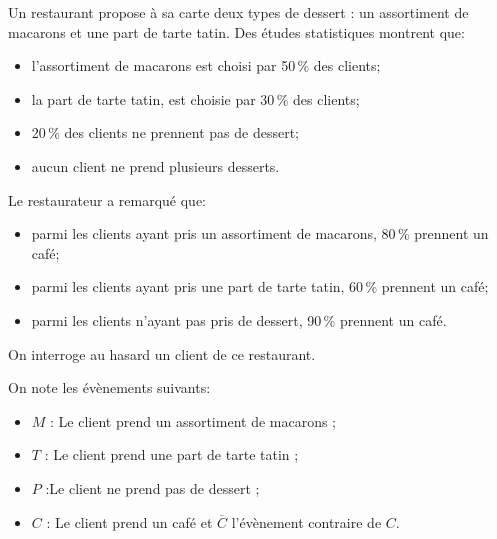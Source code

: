 \medskip

Un restaurant propose à sa carte deux types de dessert : un assortiment de macarons et une part de tarte tatin. Des études statistiques montrent que:

\setlength\parindent{1cm}
\begin{itemize}
\item l'assortiment de macarons est choisi par 50\,\% des clients;
\item la part de tarte tatin, est choisie par 30\,\% des clients;
\item 20\,\% des clients ne prennent pas de dessert;
\item aucun client ne prend plusieurs desserts.
\end{itemize}
\setlength\parindent{0cm}

Le restaurateur a remarqué que:

\setlength\parindent{1cm}
\begin{itemize}
\item parmi les clients ayant pris un assortiment de macarons, 80\,\% prennent un café;
\item parmi les clients ayant pris une part de tarte tatin, 60\,\% prennent un café;
\item parmi les clients n'ayant pas pris de dessert, 90\,\% prennent un café.
\end{itemize}
\setlength\parindent{0cm}

On interroge au hasard un client de ce restaurant. 

On note les évènements suivants:

\setlength\parindent{1cm}
\begin{itemize}
\item $M$ : \og Le client prend un assortiment de macarons \fg{};
\item $T$ : \og Le client prend une part de tarte tatin \fg{} ;
\item $P$ :\og Le client ne prend pas de dessert\fg{} ;
\item $C$ : \og Le client prend un café\fg{} et $\overline{C}$ l'évènement contraire de $C$.
\end{itemize}
\setlength\parindent{0cm}

\medskip

